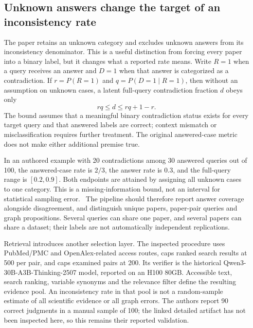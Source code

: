 \subsection{Unknown answers change the target of an inconsistency rate}

The paper retains an unknown category and excludes unknown answers from its
inconsistency denominator. This is a useful distinction from forcing every
paper into a binary label, but it changes what a reported rate means. Write
$R=1$ when a query receives an answer and $D=1$ when that answer is categorized
as a contradiction. If $r=P(R=1)$ and $q=P(D=1\mid R=1)$, then without an
assumption on unknown cases, a latent full-query contradiction fraction $d$
obeys only
\begin{equation}
 rq\leq d\leq rq+1-r.
\label{exec17:validity-unknown}
\end{equation}
The bound assumes that a meaningful binary contradiction status exists for
every target query and that answered labels are correct; context mismatch or
misclassification requires further treatment. The original answered-case
metric does not make either additional premise true.
\citep{exec17_benchmark_consistency}

In an authored example with 20 contradictions among 30 answered queries out
of 100, the answered-case rate is $2/3$, the answer rate is $0.3$, and the
full-query range is $[0.2,0.9]$. Both endpoints are attained by assigning all
unknown cases to one category. This is a missing-information bound, not an
interval for statistical sampling error.~\citep{exec17_advice_validity_exact}
The pipeline should therefore report answer coverage alongside disagreement,
and distinguish unique papers, paper-pair queries and graph propositions.
Several queries can share one paper, and several papers can share a dataset;
their labels are not automatically independent replications.

Retrieval introduces another selection layer. The inspected procedure uses
PubMed/PMC and OpenAlex-related access routes, caps ranked search results at
500 per pair, and caps examined pairs at 200. Its verifier is the historical
Qwen3-30B-A3B-Thinking-2507 model, reported on an H100 80GB. Accessible text,
search ranking, variable synonyms and the relevance filter define the resulting
evidence pool. An inconsistency rate in that pool is not a random-sample
estimate of all scientific evidence or all graph errors. The authors report
90 correct judgments in a manual sample of 100; the linked detailed artifact
has not been inspected here, so this remains their reported validation.
\citep{exec17_benchmark_consistency}

